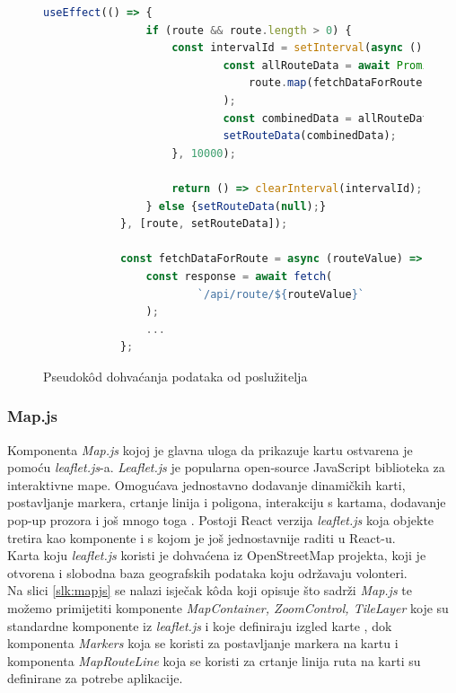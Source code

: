 \documentclass[zavrsnirad]{fer}
\begin{document}
\begin{figure}[H]
	\centering
	\begin{minipage}{0.9\linewidth}
		\begin{lstlisting}[language=JavaScript]			
			useEffect(() => {
				if (route && route.length > 0) {
					const intervalId = setInterval(async () => {
							const allRouteData = await Promise.all(
								route.map(fetchDataForRoute)
							);
							const combinedData = allRouteData.flat();
							setRouteData(combinedData);
					}, 10000);
					
					return () => clearInterval(intervalId);
				} else {setRouteData(null);}
			}, [route, setRouteData]);
			
			const fetchDataForRoute = async (routeValue) => {
				const response = await fetch(
						`/api/route/${routeValue}`
				);
				...
			};
		\end{lstlisting}
	\end{minipage}
	\caption{Pseudok\^od dohvaćanja podataka od poslužitelja}
	\label{slk:dohvatpodataka}
\end{figure}

\subsubsection{Map.js}
Komponenta \textit{Map.js} kojoj je glavna uloga da prikazuje kartu ostvarena je pomoću \textit{leaflet.js}-a.
\textit{Leaflet.js} je popularna open-source JavaScript biblioteka za interaktivne mape. Omogućava jednostavno dodavanje dinamičkih karti, postavljanje markera, crtanje linija i poligona, interakciju s kartama, dodavanje pop-up prozora i još mnogo toga \cite{leaflet}.
Postoji React verzija \textit{leaflet.js} koja objekte tretira kao komponente i s kojom je još jednostavnije raditi u React-u.\\
Karta koju \textit{leaflet.js} koristi je dohvaćena iz OpenStreetMap projekta, koji je otvorena i slobodna baza geografskih podataka koju održavaju volonteri.\\

Na slici \ref{slk:mapjs} se nalazi isječak k\^oda koji opisuje što sadrži \textit{Map.js} te možemo primijetiti komponente \textit{MapContainer, ZoomControl, TileLayer} koje su standardne komponente iz \textit{leaflet.js} i koje definiraju izgled karte , dok komponenta \textit{Markers} koja se koristi za postavljanje markera na kartu i komponenta \textit{MapRouteLine} koja se koristi za crtanje linija ruta na karti su definirane za potrebe aplikacije.
\end{document}
